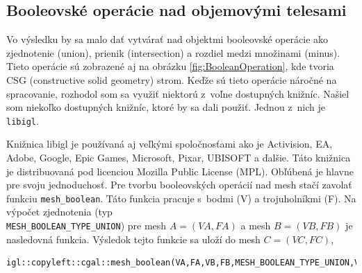 






\subsection*{Booleovské operácie nad objemovými telesami}
Vo výsledku by sa malo dať vytvárať nad objektmi booleovské operácie ako zjednotenie (union), prienik (intersection) a rozdiel medzi množinami (minus). Tieto operácie sú zobrazené aj na obrázku \ref{fig:BooleanOperation}, kde tvoria CSG (constructive solid geometry) strom. Keďže sú tieto operácie náročné na spracovanie, rozhodol som sa využiť niektorú z~voľne dostupných knižníc. Našiel som niekoľko dostupných knižníc, ktoré by sa dali použiť. Jednou z~nich je \texttt{libigl}\cite{libigl}.

Knižnica libigl je používaná aj veľkými spoločnosťami ako je Activision, EA, Adobe, Google, Epic Games, Microsoft, Pixar, UBISOFT a ďalšie. Táto knižnica je distribuovaná pod licenciou Mozilla Public License (MPL).
Obľúbená je hlavne pre svoju jednoduchosť. Pre tvorbu booleovských operácií nad mesh stačí zavolať funkciu \texttt{mesh\_boolean}.
Táto funkcia pracuje s~bodmi (V) a trojuholníkmi (F). Na výpočet zjednotenia (typ \\ \texttt{MESH\_BOOLEAN\_TYPE\_UNION}) pre mesh $A=(VA,FA)$ a mesh $B=(VB,FB)$ je nasledovná funkcia. Výsledok tejto funkcie sa uloží do mesh $C=(VC,FC)$,

\begin{lstlisting}
igl::copyleft::cgal::mesh_boolean(VA,FA,VB,FB,MESH_BOOLEAN_TYPE_UNION,VC,FC);
\end{lstlisting}

